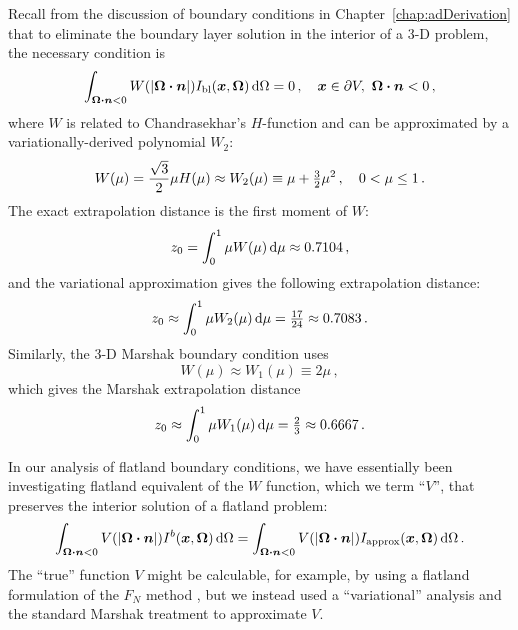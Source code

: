 Recall from the discussion of boundary conditions in
Chapter~\ref{chap:adDerivation} that to eliminate the boundary layer solution
in the interior of a 3-D problem, the necessary condition is
\begin{equation}\tagref{eq:tdKillBndy}
  \int_{\vec{\Omega}\vd\vec{n} < 0}
  W(\abs{\vec{\Omega}\vd\vec{n}}) \Ibl(\vec{x},\vec{\Omega}) \ud\Omega
  = 0\,,
  \quad \vec{x}\in \partial V ,\ \vec{\Omega}\vd \vec{n} < 0\,,
\end{equation}
where $W$ is related to Chandrasekhar's $H$-function \cite{Cha1960} and can be
approximated by a variationally-derived polynomial $W_2$:
\begin{equation} \tagref{eq:chandraW}
  W(\mu) = \frac{\sqrt{3}}{2} \mu H(\mu)
  \approx W_2(\mu) \equiv \mu + \tfrac{3}{2} \mu^2 \,, \quad 0 < \mu \le 1 \,.
\end{equation}
The exact extrapolation distance is the first moment of $W$:
\begin{equation*}
  z_0 = \int_{0}^{1} \mu W(\mu) \mathop{}\!\mathrm{d}\mu
  \approx 0.7104\,,
\end{equation*}
and the variational approximation gives the following extrapolation distance:
\begin{equation*}
  z_0 \approx \int_{0}^{1} \mu W_2(\mu) \mathop{}\!\mathrm{d}\mu = \tfrac{17}{24}
  \approx 0.7083\,.
\end{equation*}
Similarly, the 3-D Marshak boundary condition uses
\begin{equation*}
  W(\mu) \approx W_1(\mu) \equiv 2 \mu \,,
\end{equation*}
which gives the Marshak extrapolation distance
\begin{equation*}
  z_0 \approx \int_{0}^{1} \mu W_1(\mu) \mathop{}\!\mathrm{d}\mu = \tfrac{2}{3}
  \approx 0.6667\,.
\end{equation*}

In our analysis of flatland boundary conditions, we have essentially been
investigating flatland equivalent of the $W$ function, which we term ``$V$'',
that preserves the interior solution of a flatland problem:
\begin{equation}\label{eq:flatKillBndy}
\int_{\bm{\Omega}\bm{\cdot}\bm{n} < 0} V( \left| \bm{\Omega}\bm{\cdot}\bm{n} \right|)
I^b(\bm{x}, \bm{\Omega}) \mathop{}\!\mathrm{d}\Omega
=
\int_{\bm{\Omega}\bm{\cdot}\bm{n} < 0} V( \left| \bm{\Omega}\bm{\cdot}\bm{n} \right|)
I_\text{approx}(\bm{x}, \bm{\Omega}) \mathop{}\!\mathrm{d}\Omega \,.
\end{equation}
The ``true'' function $V$ might be calculable, for example, by using a
flatland formulation of the $F_N$ method \cite{Sie1979}, but we instead used a
``variational'' analysis and the standard Marshak treatment to approximate $V$.

